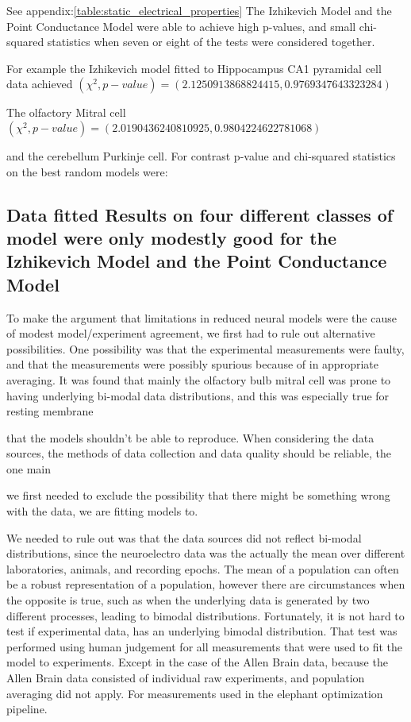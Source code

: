 See appendix:\ref{table:static_electrical_properties}
The Izhikevich Model and the Point Conductance Model were able to achieve high p-values, and small chi-squared statistics when seven or eight of the tests were considered together.

For example the Izhikevich model fitted to Hippocampus CA1 pyramidal cell data achieved $ (\chi^{2} ,p-value) =(2.1250913868824415, 0.9769347643323284) $

The olfactory Mitral cell
$ (\chi^{2} ,p-value) =(2.0190436240810925, 0.9804224622781068) $

and the cerebellum Purkinje cell. For contrast p-value and chi-squared statistics on the best random models were:

\subsection{Data fitted Results on four different classes of model were only modestly good for the Izhikevich Model and the Point Conductance Model}

To make the argument that limitations in reduced neural models were the cause of modest model/experiment agreement, we first had to rule out alternative possibilities. One possibility was that the experimental measurements were faulty, and that the measurements were possibly spurious because of in appropriate averaging. It was found that mainly the olfactory bulb mitral cell was prone to having underlying bi-modal data distributions, and this was especially true for resting membrane

that the models shouldn't be able to reproduce. When considering the data sources, the methods of data collection and data quality should be reliable, the one main 

we first needed to exclude the possibility that there might be something wrong with the data, we are fitting models to.

We needed to rule out was that the data sources did not reflect bi-modal distributions, since the neuroelectro data was the actually the mean over different laboratories, animals, and recording epochs. The mean of a population can often be a robust representation of a population, however there are circumstances when the opposite is true, such as when the underlying data is generated by two different processes, leading to bimodal distributions. Fortunately, it is not hard to test if experimental data, has an underlying bimodal distribution. That test was performed using human judgement for all measurements that were used to fit the model to experiments. Except in the case of the Allen Brain data, because the Allen Brain data consisted of individual raw experiments, and population averaging did not apply. For measurements used in the elephant optimization pipeline.

